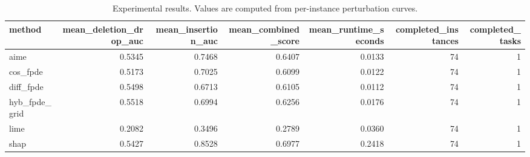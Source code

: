 \begin{table}[t]
\caption{Experimental results. Values are computed from per-instance perturbation curves.}
\label{tab:main_results_computed}
\centering
\begin{tabular}{lrrrrrr}
\toprule
method & mean\_deletion\_drop\_auc & mean\_insertion\_auc & mean\_combined\_score & mean\_runtime\_seconds & completed\_instances & completed\_tasks \\
\midrule
aime & 0.5345 & 0.7468 & 0.6407 & 0.0133 & 74 & 1 \\
cos\_fpde & 0.5173 & 0.7025 & 0.6099 & 0.0122 & 74 & 1 \\
diff\_fpde & 0.5498 & 0.6713 & 0.6105 & 0.0112 & 74 & 1 \\
hyb\_fpde\_grid & 0.5518 & 0.6994 & 0.6256 & 0.0176 & 74 & 1 \\
lime & 0.2082 & 0.3496 & 0.2789 & 0.0360 & 74 & 1 \\
shap & 0.5427 & 0.8528 & 0.6977 & 0.2418 & 74 & 1 \\
\bottomrule
\end{tabular}

\end{table}

